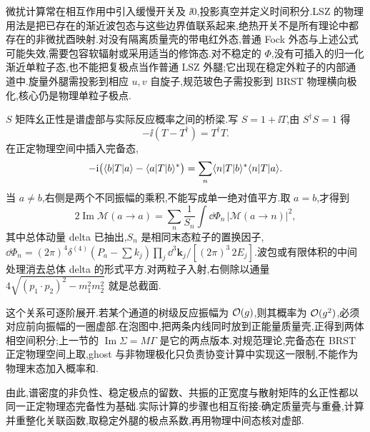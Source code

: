 微扰计算常在相互作用中引入缓慢开关及 $\ii0$,投影真空并定义时间积分.LSZ 的物理用法是把已存在的渐近波包态与这些边界值联系起来,绝热开关不是所有理论中都存在的非微扰酉映射.对没有隔离质量壳的带电红外态,普通 Fock 外态与上述公式可能失效,需要包容软辐射或采用适当的修饰态.对不稳定的 $\Phi$,没有可插入的归一化渐近单粒子态,也不能把复极点当作普通 LSZ 外腿;它出现在稳定外粒子的内部通道中.旋量外腿需投影到相应 $u,v$ 自旋子,规范玻色子需投影到 BRST 物理横向极化,核心仍是物理单粒子极点.

$S$ 矩阵幺正性是谱虚部与实际反应概率之间的桥梁.写 $S=1+\ii T$,由 $S^\dagger S=1$ 得
\[
 -\ii(T-T^\dagger)=T^\dagger T.
\]
在正定物理空间中插入完备态,
\[
 -\mathrm i\bigl(\langle b\rvert T\lvert a\rangle-\langle a\rvert T\lvert b\rangle^*\bigr)
 =\sum_n\langle n\rvert T\lvert b\rangle^*\langle n\rvert T\lvert a\rangle.
\]
当 $a\ne b$,右侧是两个不同振幅的乘积,不能写成单一绝对值平方.取 $a=b$,才得到
\begin{equation}\label{eq:optical-theorem}
 2\operatorname{Im}\mathcal M(a\to a)
 =\sum_n\frac1{S_n}\int\dd\Phi_n\,|\mathcal M(a\to n)|^2,
\end{equation}
其中总体动量 delta 已抽出,$S_n$ 是相同末态粒子的置换因子,
$\dd\Phi_n=(2\pi)^4\delta^{(4)}(P_a-\sum k_j)\prod_j\dd^3\boldsymbol k_j/[(2\pi)^3\,2E_j]$.波包或有限体积的中间处理消去总体 delta 的形式平方.对两粒子入射,右侧除以通量 $4\sqrt{(p_1\cdot p_2)^2-m_1^2m_2^2}$ 就是总截面.

这个关系可逐阶展开.若某个通道的树级反应振幅为 $\mathcal O(g)$,则其概率为 $\mathcal O(g^2)$,必须对应前向振幅的一圈虚部.在泡图中,把两条内线同时放到正能量质量壳,正得到两体相空间积分;上一节的 $\operatorname{Im}\Sigma=M\Gamma$ 是它的两点版本.对规范理论,完备态在 BRST 正定物理空间上取,ghost 与非物理极化只负责协变计算中实现这一限制,不能作为物理末态加入概率和.

由此,谱密度的非负性、稳定极点的留数、共振的正宽度与散射矩阵的幺正性都以同一正定物理态完备性为基础.实际计算的步骤也相互衔接:确定质量壳与重叠,计算并重整化关联函数,取稳定外腿的极点系数,再用物理中间态核对虚部.
